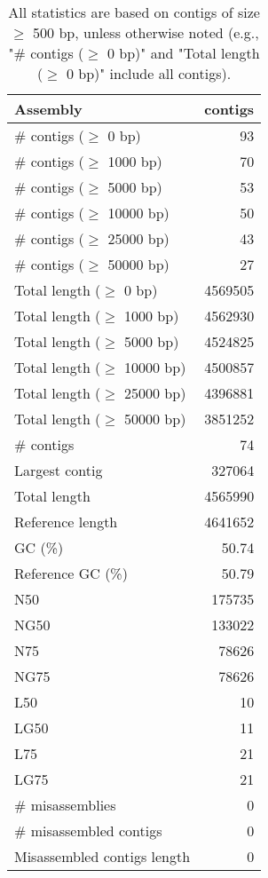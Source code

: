 \documentclass[12pt,a4paper]{article}
\begin{document}
\begin{table}[ht]
\begin{center}
\caption{All statistics are based on contigs of size $\geq$ 500 bp, unless otherwise noted (e.g., "\# contigs ($\geq$ 0 bp)" and "Total length ($\geq$ 0 bp)" include all contigs).}
\begin{tabular}{|l*{1}{|r}|}
\hline
Assembly & contigs \\ \hline
\# contigs ($\geq$ 0 bp) & 93 \\ \hline
\# contigs ($\geq$ 1000 bp) & 70 \\ \hline
\# contigs ($\geq$ 5000 bp) & 53 \\ \hline
\# contigs ($\geq$ 10000 bp) & 50 \\ \hline
\# contigs ($\geq$ 25000 bp) & 43 \\ \hline
\# contigs ($\geq$ 50000 bp) & 27 \\ \hline
Total length ($\geq$ 0 bp) & 4569505 \\ \hline
Total length ($\geq$ 1000 bp) & 4562930 \\ \hline
Total length ($\geq$ 5000 bp) & 4524825 \\ \hline
Total length ($\geq$ 10000 bp) & 4500857 \\ \hline
Total length ($\geq$ 25000 bp) & 4396881 \\ \hline
Total length ($\geq$ 50000 bp) & 3851252 \\ \hline
\# contigs & 74 \\ \hline
Largest contig & 327064 \\ \hline
Total length & 4565990 \\ \hline
Reference length & 4641652 \\ \hline
GC (\%) & 50.74 \\ \hline
Reference GC (\%) & 50.79 \\ \hline
N50 & 175735 \\ \hline
NG50 & 133022 \\ \hline
N75 & 78626 \\ \hline
NG75 & 78626 \\ \hline
L50 & 10 \\ \hline
LG50 & 11 \\ \hline
L75 & 21 \\ \hline
LG75 & 21 \\ \hline
\# misassemblies & 0 \\ \hline
\# misassembled contigs & 0 \\ \hline
Misassembled contigs length & 0 \\ \hline

\end{tabular}
\end{center}
\end{table}
\end{document}
